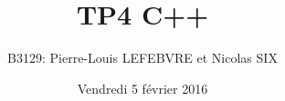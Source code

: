 \documentclass[a4paper, 12pts]{article}
\title{TP4 C++}
\author{B3129: Pierre-Louis LEFEBVRE et Nicolas SIX}
\date{Vendredi 5 février 2016}
\begin{document}
\begin{titlepage}

\maketitle

\end{titlepage}


\tableofcontents

\pagebreak





\end{document}
